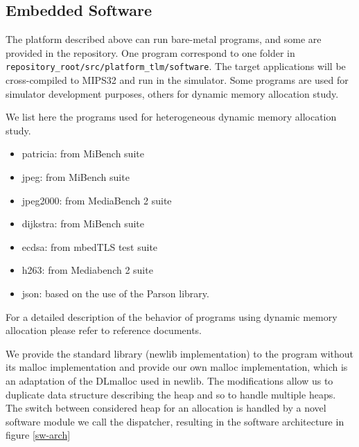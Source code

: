 \documentclass[10 pt]{article}
\begin{document}
\subsection{Embedded Software}
The platform described above can run bare-metal programs, and some are provided in the repository.
One program correspond to one folder in \lstinline{repository_root/src/platform_tlm/software}.
The target applications will be cross-compiled to MIPS32 and run in the simulator.
Some programs are used for simulator development purposes, others for dynamic memory allocation study.

We list here the programs used for heterogeneous dynamic memory allocation study.


\begin{itemize}
  \item patricia: from MiBench suite
  \item jpeg: from MiBench suite
  \item jpeg2000: from MediaBench 2 suite
  \item dijkstra: from MiBench suite
  \item ecdsa: from mbedTLS test suite
  \item h263: from Mediabench 2 suite
  \item json: based on the use of the Parson library.
\end{itemize}

For a detailed description of the behavior of programs using dynamic memory allocation please refer to reference documents.

\bigskip
We provide the standard library (newlib implementation) to the program without its malloc implementation and provide our own malloc implementation, which is an adaptation of the DLmalloc used in newlib.
The modifications allow us to duplicate data structure describing the heap and so to handle multiple heaps.
The switch between considered heap for an allocation is handled by a novel software module we call the dispatcher, resulting in the software architecture in figure \ref{sw-arch}
\end{document}
